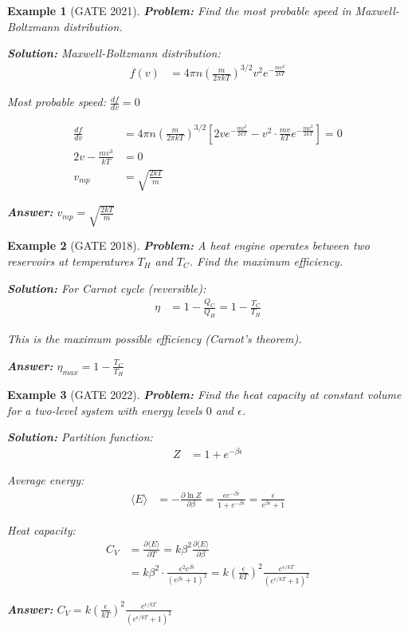 \documentclass[12pt,a4paper]{article}
\newtheorem{example}{Example}[section]
\newcommand{\ans}[1]{\textcolor{red!70!black}{\textbf{Answer:} #1}}
\newcommand{\sol}{\textcolor{blue!70!black}{\textbf{Solution:}}}
\begin{document}
\begin{example}[GATE 2021]
\textbf{Problem:} Find the most probable speed in Maxwell-Boltzmann distribution.

\sol
Maxwell-Boltzmann distribution:
\begin{align}
f(v) &= 4\pi n\left(\frac{m}{2\pi kT}\right)^{3/2} v^2 e^{-\frac{mv^2}{2kT}}
\end{align}

Most probable speed: $\frac{df}{dv} = 0$

\begin{align}
\frac{df}{dv} &= 4\pi n\left(\frac{m}{2\pi kT}\right)^{3/2}\left[2v e^{-\frac{mv^2}{2kT}} - v^2 \cdot \frac{mv}{kT}e^{-\frac{mv^2}{2kT}}\right] = 0\\
2v - \frac{mv^3}{kT} &= 0\\
v_{mp} &= \sqrt{\frac{2kT}{m}}
\end{align}

\ans{$v_{mp} = \sqrt{\frac{2kT}{m}}$}
\end{example}

\begin{example}[GATE 2018]
\textbf{Problem:} A heat engine operates between two reservoirs at temperatures $T_H$ and $T_C$. Find the maximum efficiency.

\sol
For Carnot cycle (reversible):
\begin{align}
\eta &= 1 - \frac{Q_C}{Q_H} = 1 - \frac{T_C}{T_H}
\end{align}

This is the maximum possible efficiency (Carnot's theorem).

\ans{$\eta_{max} = 1 - \frac{T_C}{T_H}$}
\end{example}

\begin{example}[GATE 2022]
\textbf{Problem:} Find the heat capacity at constant volume for a two-level system with energy levels $0$ and $\epsilon$.

\sol
Partition function:
\begin{align}
Z &= 1 + e^{-\beta\epsilon}
\end{align}

Average energy:
\begin{align}
\langle E \rangle &= -\frac{\partial \ln Z}{\partial \beta} = \frac{\epsilon e^{-\beta\epsilon}}{1 + e^{-\beta\epsilon}} = \frac{\epsilon}{e^{\beta\epsilon} + 1}
\end{align}

Heat capacity:
\begin{align}
C_V &= \frac{\partial \langle E \rangle}{\partial T} = k\beta^2 \frac{\partial \langle E \rangle}{\partial \beta}\\
&= k\beta^2 \cdot \frac{\epsilon^2 e^{\beta\epsilon}}{(e^{\beta\epsilon} + 1)^2} = k\left(\frac{\epsilon}{kT}\right)^2 \frac{e^{\epsilon/kT}}{(e^{\epsilon/kT} + 1)^2}
\end{align}

\ans{$C_V = k\left(\frac{\epsilon}{kT}\right)^2 \frac{e^{\epsilon/kT}}{(e^{\epsilon/kT} + 1)^2}$}
\end{example}
\end{document}
